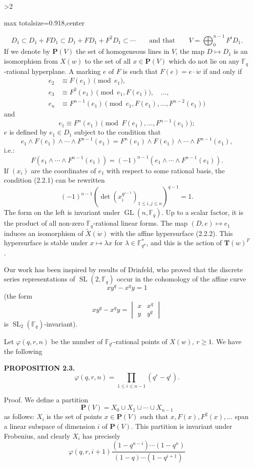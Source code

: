 \documentclass[9pt,twoside]{extarticle}
\newcommand{\EditionPage}[3]{%
  \ifnum#1>2\clearpage\fi
  \pdfbookmark[1]{Printed page #2}{en-folio-#2}%
  \hypertarget{en-physical-#1}{}%
  \noindent\begin{adjustbox}{max totalsize={\textwidth}{0.918\textheight},center}
  \begin{minipage}[t]{\textwidth}
  \fontsize{9.4}{11.1}\selectfont\justifying
  #3
  \end{minipage}
  \end{adjustbox}%
}
\begin{document}
\EditionPage{16}{117}{%
\[
D_1\subset D_1+FD_1\subset D_1+FD_1+F^2D_1\subset\cdots
\qquad\text{and that}\qquad
V=\bigoplus_0^{n-1}F^iD_1.
\] If we denote by \(\mathbf P(V)\) the set of homogeneous lines in \(V\), the map \(D\mapsto D_1\) is an isomorphism from \(X(w)\) to the set of all \(x\in\mathbf P(V)\) which do not lie on any \(\mathbb F_q\)-rational hyperplane. A marking \(e\) of \(F\) is such that \(F(e)=e\cdot\dot w\) if and only if \[
\begin{aligned}
e_2&\equiv F(e_1)\pmod{e_1},\\
e_3&\equiv F^2(e_1)\pmod{e_1,F(e_1)},\quad\ldots,\\
e_n&\equiv F^{n-1}(e_1)\pmod{e_1,F(e_1),\ldots,F^{n-2}(e_1)}
\end{aligned}
\] and \[
e_1\equiv F^n(e_1)\pmod{F(e_1),\ldots,F^{n-1}(e_1)};
\]  \(e\) is defined by \(e_1\in D_1\) subject to the condition that \[
e_1\wedge F(e_1)\wedge\cdots\wedge F^{n-1}(e_1)
=
F^n(e_1)\wedge F(e_1)\wedge\cdots\wedge F^{n-1}(e_1),
\] i.e.: \[
\tag{2.2.1}
F(e_1\wedge\cdots\wedge F^{n-1}(e_1))
=(-1)^{n-1}(e_1\wedge\cdots\wedge F^{n-1}(e_1)).
\] If \((x_i)\) are the coordinates of \(e_1\) with respect to some rational basis, the condition (2.2.1) can be rewritten \[
\tag{2.2.2}
(-1)^{n-1}\left(\det(x_i^{q^{j-1}})_{1\le i,j\le n}\right)^{q-1}=1.
\] The form on the left is invariant under \(\operatorname{GL}(n,\mathbb F_q)\). Up to a scalar factor, it is the product of all non-zero \(\mathbb F_q\)-rational linear forms. The map \((D,e)\mapsto e_1\) induces an isomorphism of \(\widetilde X(\dot w)\) with the affine hypersurface (2.2.2). This hypersurface is stable under \(x\mapsto\lambda x\) for \(\lambda\in\mathbb F_{q^n}^*\), and this is the action of \(\mathbf T(w)^F\).\par

Our work has been inspired by results of Drinfeld, who proved that the discrete series representations of \(\operatorname{SL}(2,\mathbb F_q)\) occur in the cohomology of the affine curve \[
xy^q-x^qy=1
\] (the form \[
xy^q-x^qy=\begin{vmatrix}x&x^q\\y&y^q\end{vmatrix}
\] is \(\operatorname{SL}_2(\mathbb F_q)\)-invariant).\par

Let \(\varphi(q,r,n)\) be the number of \(\mathbb F_{q^r}\)-rational points of \(X(w)\), \(r\ge1\). We have the following\par

\noindent\textbf{PROPOSITION 2.3.} \[
\varphi(q,r,n)=\prod_{1\le i\le n-1}(q^r-q^i).
\]\par

Proof. We define a partition \[
\mathbf P(V)=X_0\cup X_1\cup\cdots\cup X_{n-1}
\] as follows: \(X_i\) is the set of points \(x\in\mathbf P(V)\) such that \(x,F(x),F^2(x),\ldots\) span a linear subspace of dimension \(i\) of \(\mathbf P(V)\). This partition is invariant under Frobenius, and clearly \(X_i\) has precisely \[
\varphi(q,r,i+1)\frac{(1-q^{n-i})\cdots(1-q^n)}{(1-q)\cdots(1-q^{i+1})}
\]\par
}
\end{document}
